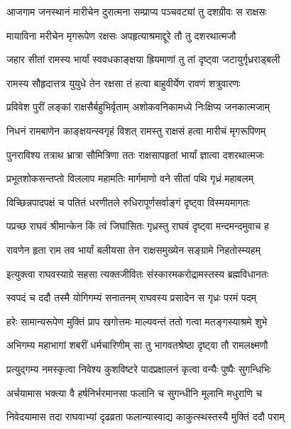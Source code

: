 \twolineshloka
{आजगाम जनस्थानं मारीचेन दुरात्मना}
{सम्प्राप्य पञ्चवट्यां तु दशग्रीवः स राक्षसः}%

\twolineshloka
{मायाविना मरीचेन मृगरूपेण रक्षसः}
{अपहृत्याश्रमाद्दूरे तौ तु दशरथात्मजौ}%

\twolineshloka
{जहार सीतां रामस्य भार्यां स्ववधकाङ्क्षया}
{ह्रियमाणां तु तां दृष्ट्वा जटायुर्गृध्रराड्बली}%

\twolineshloka
{रामस्य सौहृदात्तत्र युयुधे तेन रक्षसा}
{तं हत्वा बाहुवीर्येण रावणं शत्रुवारणः}%

\twolineshloka
{प्रविवेश पुरीं लङ्कां राक्षसैर्बहुभिर्वृताम्}
{अशोकवनिकामध्ये निःक्षिप्य जनकात्मजाम्}%

\twolineshloka
{निधनं रामबाणेन काङ्क्षयन्स्वगृहं विशत्}
{रामस्तु राक्षसं हत्वा मारीचं मृगरूपिणम्}%

\twolineshloka
{पुनराविश्य तत्राथ भ्रात्रा सौमित्रिणा ततः}
{राक्षसापहृतां भार्यां ज्ञात्वा दशरथात्मजः}%

\twolineshloka
{प्रभूतशोकसन्तप्तो विललाप महामतिः}
{मार्गमाणो वने सीतां पथि गृध्रं महाबलम्}%

\twolineshloka
{विच्छिन्नपादपक्षं च पतितं धरणीतले}
{रुधिरापूर्णसर्वाङ्गं दृष्ट्वा विस्मयमागतः}%

\twolineshloka
{पप्रच्छ राघवं श्रीमान्केन किं त्वं जिघांसितः}
{गृध्रस्तु राघवं दृष्ट्वा मन्दमन्दमुवाच ह}%


\twolineshloka
{रावणेन हृता राम तव भार्यां बलीयसा}
{तेन राक्षसमुख्येन सङ्ग्रामे निहतोस्म्यहम्}%


\twolineshloka
{इत्युक्त्वा राघवस्याग्रे सहसा त्यक्तजीवितः}
{संस्कारमकरोद्रामस्तस्य ब्रह्मविधानतः}%

\twolineshloka
{स्वपदं च ददौ तस्मै योगिगम्यं सनातनम्}
{राघवस्य प्रसादेन स गृध्रः परमं पदम्}%

\twolineshloka
{हरेः सामान्यरूपेण मुक्तिं प्राप खगोत्तमः}
{माल्यवन्तं ततो गत्वा मतङ्गस्याश्रमे शुभे}%

\twolineshloka
{अभिगम्य महाभागां शबरीं धर्मचारिणीम्}
{सा तु भागवतश्रेष्ठा दृष्ट्वा तौ रामलक्ष्मणौ}%

\twolineshloka
{प्रत्युद्गम्य नमस्कृत्वा निवेश्य कुशविष्टरे}
{पादप्रक्षालनं कृत्वा वन्यैः पुष्पैः सुगन्धिभिः}%

\twolineshloka
{अर्चयामास भक्त्या वै हर्षनिर्भरमानसा}
{फलानि च सुगन्धीनि मूलानि मधुराणि च}%

\twolineshloka
{निवेदयामास तदा राघवाभ्यां दृढव्रता}
{फलान्यास्वाद्य काकुत्स्थस्तस्यै मुक्तिं ददौ पराम्}%

